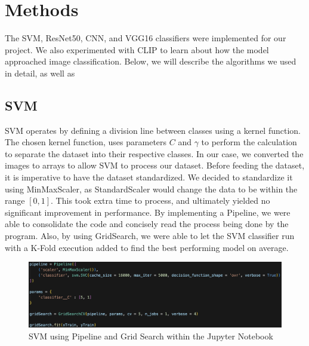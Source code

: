 \graphicspath{ {project_images/} }

\section{Methods}

The SVM, ResNet50, CNN, and VGG16 classifiers were implemented for our project. We also experimented with CLIP to learn about how the model approached image classification.
Below, we will describe the algorithms we used in detail, as well as

\subsection{SVM}
SVM operates by defining a division line between classes using a kernel function. 
The chosen kernel function, uses parameters $C$ and $\gamma$ to perform the calculation to separate the dataset into their respective classes.
In our case, we converted the images to arrays to allow SVM to process our dataset.
Before feeding the dataset, it is imperative to have the dataset standardized.
We decided to standardize it using MinMaxScaler, as StandardScaler would change the data to be within the range $[0,1]$.
This took extra time to process, and ultimately yielded no significant improvement in performance.
By implementing a Pipeline, we were able to consolidate the code and concisely read the process being done by the program.
Also, by using GridSearch, we were able to let the SVM classifier run with a K-Fold execution added to find the best performing model on average.

\begin{figure}[h]
	\centering
	\includegraphics[scale=0.5]{SVM_explained.png}
	\caption{SVM using Pipeline and Grid Search within the Jupyter Notebook}
	\label{fig:figure1}
\end{figure}

